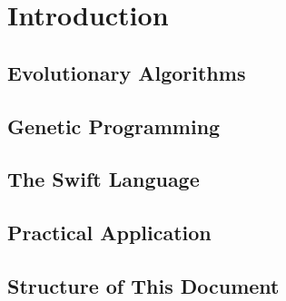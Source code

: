 \chapter*{Introduction}

\section*{Evolutionary Algorithms}
\todo

\section*{Genetic Programming}
\todo

\section*{The Swift Language}
\todo

\section*{Practical Application}
\todo

\section*{Structure of This Document}
\todo
